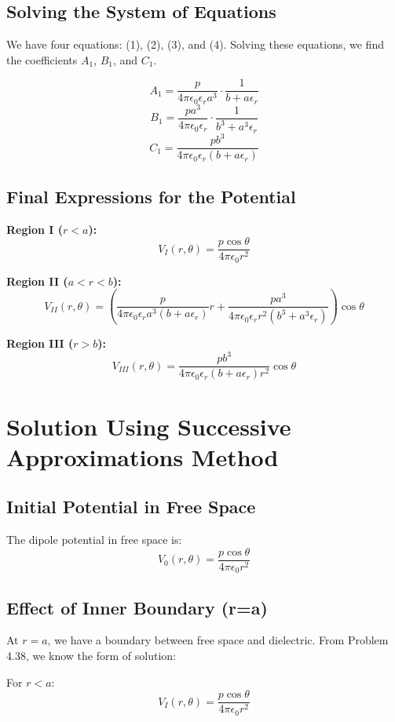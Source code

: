 \documentclass[12pt]{article}
\begin{document}
\subsection*{Solving the System of Equations}

We have four equations: (1), (2), (3), and (4). Solving these equations, we find the coefficients \(A_1\), \(B_1\), and \(C_1\).

\[
A_1 = \frac{p}{4\pi \epsilon_0 \epsilon_r a^3} \cdot \frac{1}{b + a \epsilon_r}
\]
\[
B_1 = \frac{p a^3}{4\pi \epsilon_0 \epsilon_r} \cdot \frac{1}{b^3 + a^3 \epsilon_r}
\]
\[
C_1 = \frac{p b^3}{4\pi \epsilon_0 \epsilon_r (b + a \epsilon_r)}
\]

\subsection*{Final Expressions for the Potential}

\textbf{Region I (\(r < a\)):}
\[
V_I(r, \theta) = \frac{p \cos \theta}{4\pi \epsilon_0 r^2}
\]

\textbf{Region II (\(a < r < b\)):}
\[
V_{II}(r, \theta) = \left( \frac{p}{4\pi \epsilon_0 \epsilon_r a^3 (b + a \epsilon_r)} r + \frac{p a^3}{4\pi \epsilon_0 \epsilon_r r^2 (b^3 + a^3 \epsilon_r)} \right) \cos \theta
\]

\textbf{Region III (\(r > b\)):}
\[
V_{III}(r, \theta) = \frac{p b^3}{4\pi \epsilon_0 \epsilon_r (b + a \epsilon_r) r^2} \cos \theta
\]

\section*{Solution Using Successive Approximations Method}

\subsection*{Initial Potential in Free Space}

The dipole potential in free space is:
\[
V_0(r,\theta) = \frac{p\cos\theta}{4\pi\epsilon_0r^2}
\]

\subsection*{Effect of Inner Boundary (r=a)}

At \(r=a\), we have a boundary between free space and dielectric. From Problem 4.38, we know the form of solution:

For \(r < a\):
\[
V_I(r,\theta) = \frac{p\cos\theta}{4\pi\epsilon_0r^2}
\]
\end{document}
